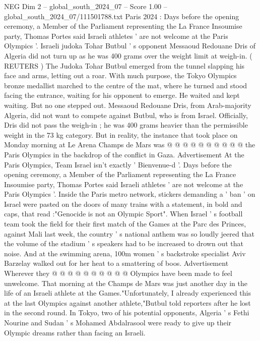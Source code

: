 \begin{textsample}{NEG Dim 2 – global\_south\_2024\_07 – Score 1.00 – global\_south\_2024\_07/111501788.txt}  \label{ex:f2_neg_281}
Paris 2024 : Days before the opening ceremony, a Member of the Parliament representing the La France Insoumise party, Thomas Portes said Israeli athletes ' are not welcome at the Paris Olympics '.
Israeli judoka Tohar Butbul ' s opponent Messaoud Redouane Dris of Algeria did not turn up as he was 400 grams over the weight limit at weigh-in. ( REUTERS ) The Judoka Tohar Butbul emerged from the tunnel slapping his face and arms, letting out a roar.
With much purpose, the Tokyo Olympics bronze medallist marched to the centre of the mat, where he turned and stood facing the entrance, waiting for his opponent to emerge.
He waited and kept waiting.
But no one stepped out.
Messaoud Redouane Dris, from Arab-majority Algeria, did not want to compete against Butbul, who is from Israel.
Officially, Dris did not pass the weigh-in ; he was 400 grams heavier than the permissible weight in the 73 kg category.
But in reality, the instance that took place on Monday morning at Le Arena Champs de Mars was @ @ @ @ @ @ @ @ @ @ the Paris Olympics in the backdrop of the conflict in Gaza.
Advertisement At the Paris Olympics, Team Israel isn't exactly ' Bienvenue-d '.
Days before the opening ceremony, a Member of the Parliament representing the La France Insoumise party, Thomas Portes said Israeli athletes ' are not welcome at the Paris Olympics '.
Inside the Paris metro network, stickers demanding a ' ban ' on Israel were pasted on the doors of many trains with a statement, in bold and caps, that read :"Genocide is not an Olympic Sport".
When Israel ' s football team took the field for their first match of the Games at the Parc des Princes, against Mali last week, the country ' s national anthem was so loudly jeered that the volume of the stadium ' s speakers had to be increased to drown out that noise.
And at the swimming arena, 100m women ' s backstroke specialist Aviv Barzelay walked out for her heat to a smattering of boos.
Advertisement Wherever they @ @ @ @ @ @ @ @ @ @ Olympics have been made to feel unwelcome.
That morning at the Champs de Mars was just another day in the life of an Israeli athlete at the Games."Unfortunately, I already experienced this at the last Olympics against another athlete,"Butbul told reporters after he lost in the second round.
In Tokyo, two of his potential opponents, Algeria ' s Fethi Nourine and Sudan ' s Mohamed Abdalrasool were ready to give up their Olympic dreams rather than facing an Israeli.

\end{textsample}
